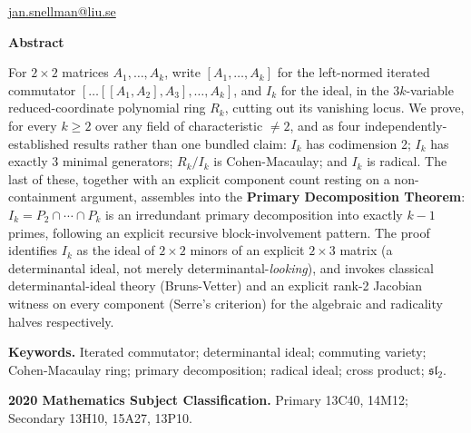 {\fontsize{9}{11}\selectfont
  \href{mailto:jan.snellman@liu.se}{jan.snellman@liu.se}\par}
\endgroup

\vspace{1.0em}

\begin{center}
\begin{minipage}{\dimexpr\textwidth-3.2cm\relax}
  \fontsize{9.2}{11.5}\selectfont
  \begin{center}\textbf{Abstract}\end{center}
  \vspace{0.25em}
  For $2 \times 2$ matrices $A_1,\dots,A_k$, write $[A_1,\dots,A_k]$ for the
  left-normed iterated commutator $[\dots[[A_1,A_2],A_3],\dots,A_k]$, and $I_k$
  for the ideal, in the $3k$-variable reduced-coordinate polynomial ring $R_k$,
  cutting out its vanishing locus. We prove, for every $k \geq 2$ over any field
  of characteristic $\neq 2$, and as four independently-established results
  rather than one bundled claim: $I_k$ has codimension 2; $I_k$ has exactly 3
  minimal generators; $R_k / I_k$ is Cohen-Macaulay; and $I_k$ is radical. The
  last of these, together with an explicit component count resting on a
  non-containment argument, assembles into the \textbf{Primary Decomposition
  Theorem}: $I_k = P_2 \cap \cdots \cap P_k$ is an irredundant primary
  decomposition into exactly $k-1$ primes, following an explicit recursive
  block-involvement pattern. The proof identifies $I_k$ as the ideal of
  $2 \times 2$ minors of an explicit $2 \times 3$ matrix (a determinantal ideal,
  not merely determinantal-\textit{looking}), and invokes classical
  determinantal-ideal theory (Bruns-Vetter) and an explicit rank-2 Jacobian
  witness on every component (Serre's criterion) for the algebraic and
  radicality halves respectively.

  \vspace{0.9em}
  {\fontsize{8.6}{10.5}\selectfont
   \textbf{Keywords.} Iterated commutator; determinantal ideal; commuting
   variety; Cohen-Macaulay ring; primary decomposition; radical ideal; cross
   product; $\mathfrak{sl}_2$.\par}

  \vspace{0.3em}
  {\fontsize{8.6}{10.5}\selectfont
   \textbf{2020 Mathematics Subject Classification.} Primary 13C40, 14M12;
   Secondary 13H10, 15A27, 13P10.\par}
\end{minipage}
\end{center}

\vspace{0.8em}
